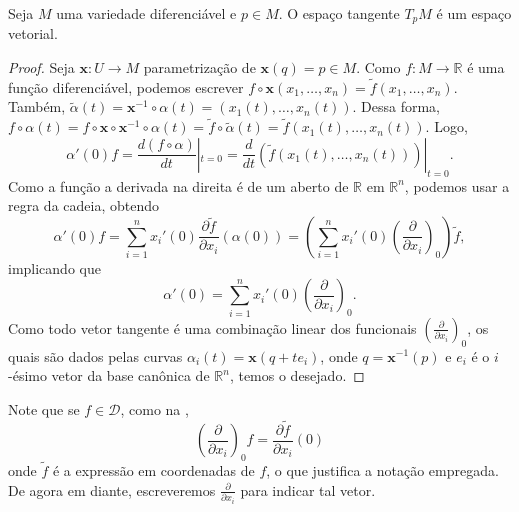 	\begin{proposition}
		\label{prop:vetor-tangente-coordenadas}
		Seja $M$ uma variedade diferenciável e $p \in M$. O espaço tangente $T_{p}M$ é um espaço vetorial.
		\begin{proof}

			Seja $\mathbf{x}:U\to M$ parametrização de $\mathbf{x}(q)=p \in M$. Como $f:M\to \mathbb{R}$ é uma função diferenciável, podemos escrever $f \circ \mathbf{x}(x_{1}, \dots, x_{n})=\tilde{f}(x_{1}, \dots, x_{n})$. Também, $\tilde{\alpha}(t)=\mathbf{x}^{-1}\circ\alpha(t)=(x_{1}(t), \dots, x_{n}(t))$.
			Dessa forma, $f \circ \alpha(t) = f \circ \mathbf{x} \circ \mathbf{x}^{-1} \circ \alpha(t) = \tilde{f} \circ \tilde{\alpha}(t) = \tilde{f}(x_{1}(t), \dots, x_{n}(t))$.
			Logo,
			\begin{equation*}
				\alpha'(0)f=\frac{d(f\circ\alpha)}{dt}|_{t=0} = \frac{d}{dt}(\tilde{f}(x_{1}(t), \dots, x_{n}(t)))|_{t=0}.
			\end{equation*}
			Como a função a derivada na direita é de um aberto de $\mathbb{R}$ em $\mathbb{R}^{n}$, podemos usar a regra da cadeia, obtendo
			\begin{equation*}
				\alpha'(0)f=\sum_{i=1}^{n}x_{i}'(0)\frac{\partial \tilde{{f}}}{\partial x_{i}}(\alpha(0)) = \left(\sum_{i=1}^{n}x_{i}'(0)\left( \frac{\partial}{\partial x_{i}} \right)_{0}\right)\tilde{f},
			\end{equation*}
			implicando que
			\begin{equation*}
				\alpha'(0)=\sum_{i=1}^{n}x_{i}'(0)\left( \frac{\partial}{\partial x_{i}} \right)_{0}.
			\end{equation*}
			Como todo vetor tangente é uma combinação linear dos funcionais $\left( \frac{\partial}{\partial x_{i}} \right)_{0}$, os quais são dados pelas curvas $\alpha _i(t)=\mathbf{x}(q+te_{i})$, onde $q=\mathbf{x}^{-1}(p)$ e $e_{i}$ é o $i$-ésimo vetor da base canônica de $\mathbb{R}^{n}$, temos o desejado.
		\end{proof}
	\end{proposition}
	Note que se $f \in \mathcal{D}$, como na ,
	\begin{equation*}
		\left( \frac{\partial}{\partial x_{i}} \right)_{0}f=\frac{\partial \tilde{f}}{\partial x_{i}}(0)
	\end{equation*}
	onde $\tilde{f}$ é a expressão em coordenadas de $f$, o que justifica a notação empregada. De agora em diante, escreveremos $\frac{\partial}{\partial x_{i}}$ para indicar tal vetor.

